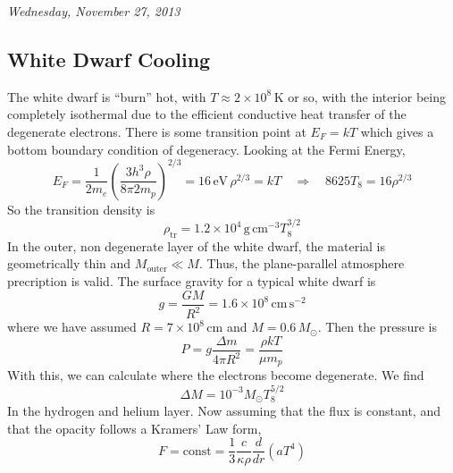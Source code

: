 \documentclass[10pt]{article}
\numberwithin{equation}{section}
\newcommand{\n}{\noindent}
\begin{document}
    \n\textit{Wednesday, November 27, 2013}

    \subsection{White Dwarf Cooling}
    \label{sec:white-dwarf-cooling}
    The white dwarf is ``burn'' hot, with $T\approx 2\times
    10^8\,\mathrm{K}$ or so, with the interior being completely
    isothermal due to the efficient conductive heat transfer of the
    degenerate electrons. There is some transition point at $E_F=kT$
    which gives a bottom boundary condition of degeneracy. Looking at
    the Fermi Energy,
    \begin{equation}
      \label{eq:334}
      E_F=\frac{1}{2m_e}\left(\frac{3h^3\rho}{8\pi
          2m_p}\right)^{2/3}=16\,\mathrm{eV}\,\rho^{2/3} =k T\quad
      \Rightarrow \quad 8625 T_8=16\rho^{2/3}
    \end{equation}
    So the transition density is
    \begin{equation}
      \label{eq:335}
      \rho_{\mathrm{tr}}=1.2\times 10^4\,\mathrm{g\,cm^{-3}}T_8^{3/2}
    \end{equation}
    \n In the outer, non degenerate layer of the white dwarf, the
    material is geometrically thin and $M_{\mathrm{outer}}\ll
    M$. Thus, the plane-parallel atmosphere precription is valid. The
    surface gravity for a typical white dwarf is
    \begin{equation}
      \label{eq:291}
      g=\frac{GM}{R^2}=1.6\times 10^8\,\mathrm{cm\,s^{-2}}
    \end{equation}
    where we have assumed $R=7\times 10^8\,\mathrm{cm}$ and
    $M=0.6\,M_\odot$. Then the pressure is
    \begin{equation}
      \label{eq:292}
      P=g\frac{\Delta m}{4\pi R^2}=\frac{\rho kT}{\mu m_p}
    \end{equation}
    With this, we can calculate where the electrons become
    degenerate. We find
    \begin{equation}
      \label{eq:293}
      \Delta M=10^{-3}M_\odot T_8^{5/2}
    \end{equation}
    In the hydrogen and helium layer. Now assuming that the flux is
    constant, and that the opacity follows a Kramers' Law form,
    \begin{equation}
      \label{eq:294}
      F=\mathrm{const}=\frac{1}{3}\frac{c}{\kappa\rho}\frac{d}{dr}\left
(aT^4\right)
    \end{equation}
\end{document}
